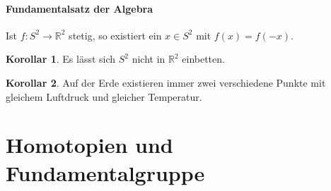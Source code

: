 \documentclass[a4paper,11pt,notitlepage]{report}
\theoremstyle{definition}
\newtheorem{corollary}{Korollar}[chapter]
\newcommand{\R}{{\ensuremath{\mathbb{R}}}}
\begin{document}
\paragraph{Fundamentalsatz der Algebra}

\begin{theorem}
	Ist $f \colon S^2 \rightarrow \R^2$ stetig, so existiert ein $x \in S^2$ mit $f(x) = f(-x)$.
\end{theorem}

\begin{corollary}
	Es lässt sich $S^2$ nicht in $\R^2$ einbetten.
\end{corollary}

\begin{corollary}
	Auf der Erde existieren immer zwei verschiedene Punkte mit gleichem Luftdruck und gleicher Temperatur.	
\end{corollary}

\section{Homotopien und Fundamentalgruppe}
\end{document}
